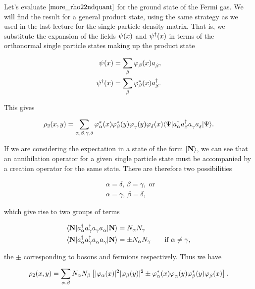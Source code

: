 Let's evaluate \(\eqref{more_rho22ndquant}\) for the ground state of the
Fermi gas. We will find the result for a general product state, using
the same strategy as we used in the last lecture for the single particle
density matrix. That is, we substitute the expansion of the fields
\(\pop(x)\) and \(\psi^\dagger(x)\) in terms of the orthonormal single particle
states making up the product state

\[
\begin{align}
    \pop(x)=\sum_{\beta}  \varphi^{}_{\beta}(x)\aop_{\beta},\nonumber\\
  \pdop(x)=\sum_{\beta}  \varphi^*_{\beta}(x)\adop_{\beta}.
\end{align}
\]

This gives

\[
    \label{2nd_quant_CEval}
    \rho_2(x,y)=\sum_{\alpha, \beta, \gamma, \delta}\varphi^{*}_{\alpha}(x)\varphi^{*}_{\beta}(y)\varphi^{}_{\gamma}(y)\varphi^{}_{\delta}(x)\braket{\Psi}{\adop_{\alpha}\adop_{\beta}\aop_{\gamma}\aop_{\delta}}{\Psi}.
\]

If we are considering the expectation in a state of the form
\(\lvert{\mathbf{N}}\rangle\), we can see that an annihilation operator for a
given single particle state must be accompanied by a creation operator
for the same state. There are therefore two possibilities

\[
\begin{align}
    &\alpha =\delta,\, \beta=\gamma, \text{ or }\nonumber\\
  &\alpha=\gamma,\, \beta=\delta,
\end{align}
\]

which give rise to two groups of terms

\[
\begin{align}
\braket{\mathbf{N}}{\adop_{\alpha}\adop_{\gamma}\aop_{\gamma}\aop_{\alpha}}{\mathbf{N}}&=N_{\alpha}N_{\gamma}\nonumber\\
    \braket{\mathbf{N}}{\adop_{\alpha}\adop_{\gamma}\aop_{\alpha}\aop_{\gamma}}{\mathbf{N}}&=\pm N_{\alpha}N_{\gamma}\qquad\text{if }\alpha\neq\gamma,
\end{align}
\]

the \(\pm\) corresponding to bosons and fermions respectively. Thus we
have

\[
\begin{align}
\rho_2(x,y)=\sum_{\alpha, \beta}N_\alpha N_\beta\left[\lvert{\varphi_{\alpha}(x)}\rvert^2\lvert{\varphi_{\beta}(y)}\rvert^2 \pm \varphi^*_\alpha(x)\varphi^{}_\alpha(y)\varphi^*_\beta(y)\varphi^{}_\beta(x) \right].
\label{more_rho2result}
\end{align}
\]

